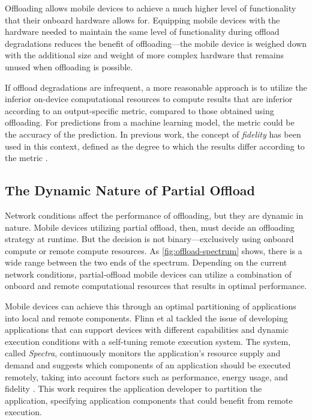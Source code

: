 Offloading allows mobile devices to achieve a much higher level of
functionality that their onboard hardware allows for. Equipping mobile devices
with the hardware needed to maintain the same level of functionality during
offload degradations reduces the benefit of offloading---the mobile device is
weighed down with the additional size and weight of more complex hardware that
remains unused when offloading is possible.

If offload degradations are infrequent, a more reasonable approach is to
utilize the inferior on-device computational resources to compute results that
are inferior according to an output-specific metric, compared to those obtained
using offloading. For predictions from a machine learning model, the metric
could be the accuracy of the prediction. In previous work, the concept of
\textit{fidelity} has been used in this context, defined as the degree to which
the results differ according to the metric \cite{noble1997}.

\subsection{The Dynamic Nature of Partial Offload}
\label{sec:offloading-dynamic-nature}

Network conditions affect the performance of offloading, but they are dynamic
in nature. Mobile devices utilizing partial offload, then, must decide an
offloading strategy at runtime. But the decision is not binary---exclusively
using onboard compute or remote compute resources.  As
\cref{fig:offload-spectrum} shows, there is a wide range between the two ends
of the spectrum. Depending on the current network conditions, partial-offload
mobile devices can utilize a combination of onboard and remote computational
resources that results in optimal performance.

Mobile devices can achieve this through an optimal partitioning of applications
into local and remote components. Flinn et al tackled the issue of developing
applications that can support devices with different capabilities and dynamic
execution conditions with a self-tuning remote execution system. The system,
called \textit{Spectra}, continuously monitors the application's resource
supply and demand and suggests which components of an application should be
executed remotely, taking into account factors such as performance, energy
usage, and fidelity \cite{flinn2002}. This work requires the application
developer to partition the application, specifying application components
that could benefit from remote execution.

